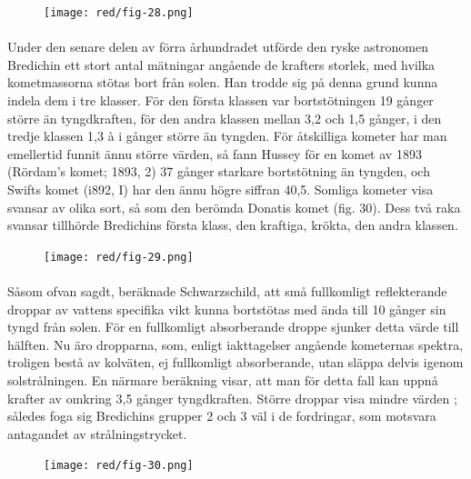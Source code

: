 \documentclass[a4paper, 12pt, oneside, swedish]{article}
\begin{document}
\begin{figure}[H]
\centering
\texttt{[image: red/fig-28.png]}
\caption{}
\end{figure}
\paragraph{}
Under den senare delen av förra århundradet utförde den ryske astronomen Bredichin ett stort antal mätningar angående de krafters storlek, med hvilka kometmassorna stötas bort från solen. Han trodde sig på denna grund kunna indela dem i tre klasser. För den första klassen var bortstötningen 19 gånger större än tyngdkraften, för den andra klassen mellan 3,2 och 1,5 gånger, i den tredje klassen 1,3 à i gånger större än tyngden. För åtskilliga kometer har man emellertid funnit ännu större värden, så fann Hussey för en komet av 1893 (Rördam's komet; 1893, 2) 37 gånger starkare bortstötning än tyngden, och Swifts komet (i892, I) har den ännu högre siffran 40,5. Somliga kometer visa svansar av olika sort, så som den berömda Donatis komet (fig. 30). Dess två raka svansar tillhörde Bredichins första klass, den kraftiga, krökta, den andra klassen.

\begin{figure}[H]
\centering
\texttt{[image: red/fig-29.png]}
\caption{}
\end{figure}
\paragraph{}
Såsom ofvan sagdt, beräknade Schwarzschild, att små fullkomligt reflekterande droppar av vattens specifika vikt kunna bortstötas med ända till 10 gånger sin tyngd från solen. För en fullkomligt absorberande droppe sjunker detta värde till hälften. Nu äro dropparna, som, enligt iakttagelser angående kometernas spektra, troligen bestå av kolväten, ej fullkomligt absorberande, utan släppa delvis igenom solstrålningen. En närmare beräkning visar, att man för detta fall kan uppnå krafter av omkring 3,5 gånger tyngdkraften. Större droppar visa mindre värden ; således foga sig Bredichins grupper 2 och 3 väl i de fordringar, som motsvara antagandet av strålningstrycket.

\begin{figure}[H]
\centering
\texttt{[image: red/fig-30.png]}
\caption{}
\end{figure}
\end{document}

